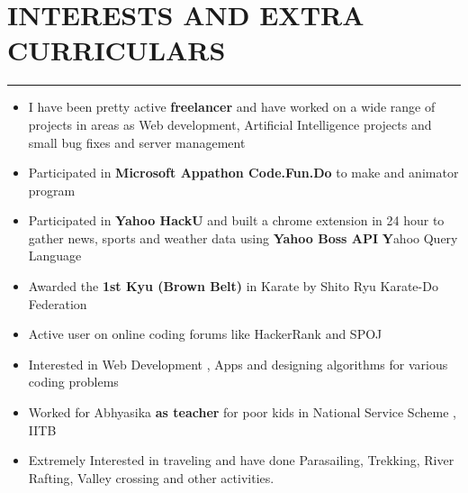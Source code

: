 \documentclass[11pt]{article} %
\begin{document}
\section*{INTERESTS AND EXTRA CURRICULARS}
\vspace{-3mm}
\hrule
\medskip
\begin{itemize}
\itemsep-0.4em
\item I have been pretty active \textbf{freelancer} and have worked on a wide range of projects in areas as Web development, Artificial Intelligence projects and small bug fixes and server management
\item Participated in \textbf{Microsoft Appathon Code.Fun.Do} to make and animator program
\item Participated in \textbf{Yahoo HackU} and built a chrome extension in 24 hour to gather news, sports and weather data using {\bf Yahoo Boss API} {\textbf Yahoo Query Language}
\item Awarded the \textbf{1st Kyu (Brown Belt)} in Karate by Shito Ryu Karate-Do Federation
\item Active user on online coding forums like HackerRank and SPOJ
\item Interested in Web Development , Apps and designing algorithms for various coding problems
\item Worked for Abhyasika \textbf{as teacher }for poor kids in National Service Scheme , IITB
\item Extremely Interested in traveling and  have done Parasailing, Trekking, River Rafting, Valley crossing 
and other activities.
\end{itemize}
\end{document}
